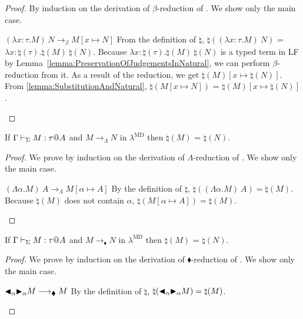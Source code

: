 \begin{proof}
    By induction on the derivation of $\beta$-reduction of \LMD.
    We show only the main case.
    \newcommand{\R}{\longrightarrow_{\beta}}
    \begin{rneqncase}{$(\lambda x:\tau.M)\ N \R M[x \mapsto N]$}{}
        From the definition of $\natural$, $\natural((\lambda x:\tau.M)\ N)$ =
        $\lambda x:\natural(\tau).\natural(M)\ \natural(N)$.  Because $\lambda
        x:\natural(\tau).\natural(M)\ \natural(N)$ is a typed term in LF by
        Lemma~\ref{lemma:PreservationOfJudgementsInNatural}, we can perform
        $\beta$-reduction from it.  As a result of the reduction, we get
        $\natural(M)[x\mapsto\natural(N)]$.  From
        \ref{lemma:SubstitutionAndNatural}, $\natural(M[x \mapsto N])$ =
        $\natural(M)[x\mapsto\natural(N)]$.
    \end{rneqncase}
\end{proof}

\begin{lemma}
    \label{lemma:PreservationOfLambdaReductionInNatural}
    If $\G \V M:\tau@A$ and $M \longrightarrow_\Lambda N$ in $\lambda^{\text{MD}}$
    then $\natural(M)$ =  $\natural(N)$.
\end{lemma}

\begin{proof}
    We prove by induction on the derivation of $\Lambda$-reduction of \LMD.
    We show only the main case.
    \begin{rneqncase}{\( (\Lambda\alpha.M)\ A \longrightarrow_\Lambda M[\alpha\mapsto A] \)}{}
            By the definition of $\natural$, \(\natural((\Lambda\alpha.M)\ A) =
            \natural(M)\).  Because \(\natural(M)\) does not contain
            \(\alpha\), \(\natural(M[\alpha\mapsto A]) = \natural(M)\).
    \end{rneqncase}
\end{proof}

\begin{lemma}
    \label{lemma:PreservationOfBlacklozengeReductionInNatural}
    If $\G \V M:\tau@A$ and ${M \longrightarrow_\blacklozenge N}$ in $\lambda^{\text{MD}}$
    then $\natural(M)$ =  $\natural(N)$.
\end{lemma}

\begin{proof}
    We prove by induction on the derivation of $\blacklozenge$-reduction of
    \LMD.  We show only the main case.
    \begin{rneqncase}{ \( {\mathop{\blacktriangleleft}}_\alpha {\mathop{\blacktriangleright}}_\alpha M \longrightarrow_\blacklozenge M \) }{}
        By the definition of $\natural$, \(\natural({\mathop{\blacktriangleleft}}_\alpha {\mathop{\blacktriangleright}}_\alpha M) =
        \natural(M)\).
    \end{rneqncase}
\end{proof}

